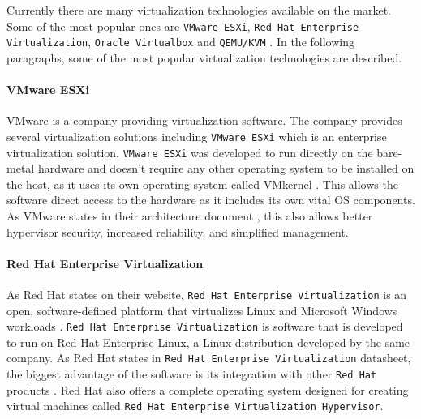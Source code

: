 Currently there are many virtualization technologies available on the market. Some of the most popular ones are \texttt{VMware ESXi}, \texttt{Red Hat Enterprise Virtualization}, \texttt{Oracle Virtualbox} and \texttt{QEMU/KVM} \cite{virtualizationpopular}. In the following paragraphs, some of the most popular virtualization technologies are described.
\paragraph{VMware ESXi}
VMware is a company providing virtualization software. The company provides several virtualization solutions including \texttt{VMware ESXi} which is an enterprise virtualization solution. \texttt{VMware ESXi} was developed to run directly on the bare-metal hardware and doesn't require any other operating system to be installed on the host, as it uses its own operating system called VMkernel \cite{vmwarearch}. This allows the software direct access to the hardware as it includes its own vital OS components. As VMware states in their architecture document \cite{vmwarearch}, this also allows better hypervisor security, increased reliability, and simplified management. 
\paragraph{Red Hat Enterprise Virtualization}
As Red Hat states on their website, \texttt{Red Hat Enterprise Virtualization} is an open, software-defined platform that virtualizes Linux and Microsoft Windows workloads \cite{rhev}. \texttt{Red Hat Enterprise Virtualization} is software that is developed to run on Red Hat Enterprise Linux, a Linux distribution developed by the same company. As Red Hat states in \texttt{Red Hat Enterprise Virtualization} datasheet, the biggest advantage of the software is its integration with other \texttt{Red Hat} products \cite{rhdatasheet}. Red Hat also offers a complete operating system designed for creating virtual machines called \texttt{Red Hat Enterprise Virtualization Hypervisor}.
